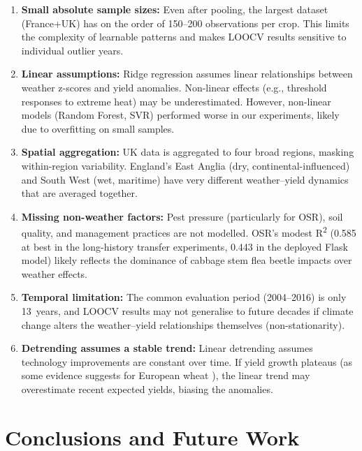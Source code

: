 \documentclass[12pt,a4paper]{report}
\newcommand{\rsq}{R\textsuperscript{2}}
\begin{document}
\begin{enumerate}
    \item \textbf{Small absolute sample sizes:} Even after pooling, the largest dataset (France+UK) has on the order of 150--200 observations per crop. This limits the complexity of learnable patterns and makes LOOCV results sensitive to individual outlier years.

    \item \textbf{Linear assumptions:} Ridge regression assumes linear relationships between weather z-scores and yield anomalies. Non-linear effects (e.g., threshold responses to extreme heat) may be underestimated. However, non-linear models (Random Forest, SVR) performed worse in our experiments, likely due to overfitting on small samples.

    \item \textbf{Spatial aggregation:} UK data is aggregated to four broad regions, masking within-region variability. England's East Anglia (dry, continental-influenced) and South West (wet, maritime) have very different weather--yield dynamics that are averaged together.

    \item \textbf{Missing non-weather factors:} Pest pressure (particularly for OSR), soil quality, and management practices are not modelled. OSR's modest \rsq{} (0.585 at best in the long-history transfer experiments, 0.443 in the deployed Flask model) likely reflects the dominance of cabbage stem flea beetle impacts over weather effects.

    \item \textbf{Temporal limitation:} The common evaluation period (2004--2016) is only 13~years, and LOOCV results may not generalise to future decades if climate change alters the weather--yield relationships themselves (non-stationarity).

    \item \textbf{Detrending assumes a stable trend:} Linear detrending assumes technology improvements are constant over time. If yield growth plateaus (as some evidence suggests for European wheat \citep{moore2015}), the linear trend may overestimate recent expected yields, biasing the anomalies.
\end{enumerate}


\chapter{Conclusions and Future Work}
\end{document}

